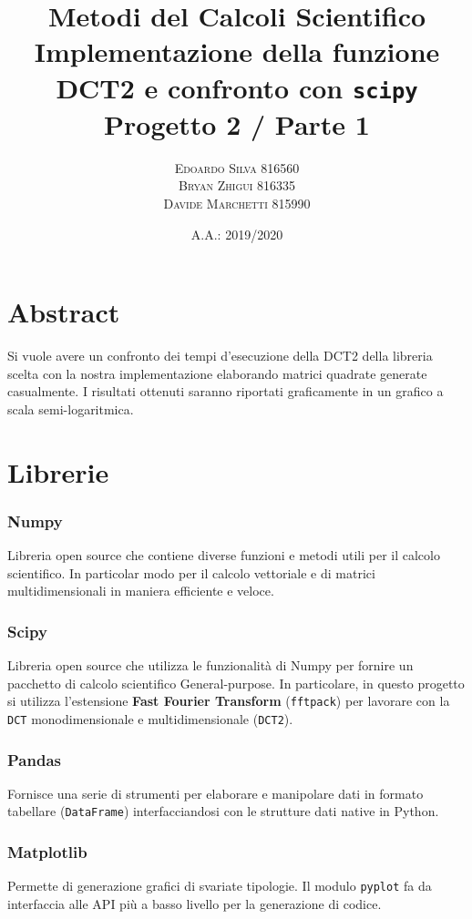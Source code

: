 \documentclass[11pt,italian]{article}
\title{
    Metodi del Calcoli Scientifico \\
    \normalsize Implementazione della funzione DCT2 e confronto con \lstinline{scipy} \\
	\normalsize Progetto 2 / Parte 1
}
\date{A.A.: 2019/2020}
\author{
	\normalsize
	\textsc{Edoardo Silva 816560} \\
	\normalsize
	\textsc{Bryan Zhigui 816335} \\
	\normalsize
	\textsc{Davide Marchetti 815990}
}
\begin{document}
\maketitle

\section*{Abstract}
Si vuole avere un confronto dei tempi d’esecuzione della DCT2 della libreria scelta con la nostra implementazione elaborando matrici quadrate generate casualmente.
I risultati ottenuti saranno riportati graficamente in un grafico a scala semi-logaritmica.

\newpage
\section{Librerie}
\subsubsection*{Numpy}
Libreria open source che contiene diverse funzioni e metodi utili per il calcolo scientifico. In particolar modo per il calcolo vettoriale e di matrici multidimensionali in maniera efficiente e veloce.

\subsubsection*{Scipy}
Libreria open source che utilizza le funzionalità di Numpy per fornire un pacchetto di calcolo scientifico General-purpose. In particolare, in questo progetto si utilizza l'estensione \textbf{Fast Fourier Transform} (\lstinline{fftpack}) per lavorare con la \lstinline{DCT} monodimensionale e multidimensionale (\lstinline{DCT2}).

\subsubsection*{Pandas}
Fornisce una serie di strumenti per elaborare e manipolare dati in formato tabellare (\lstinline{DataFrame}) interfacciandosi con le strutture dati native in Python.

\subsubsection*{Matplotlib}
Permette di generazione grafici di svariate tipologie.
Il modulo \lstinline{pyplot} fa da interfaccia alle API più a basso livello per la generazione di codice.
\end{document}
